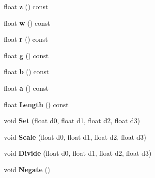 \begin{DoxyCompactItemize}
\item 
\hypertarget{classVec4f_a810931422b57413fe997648b7b3af01d}{float {\bfseries z} () const }\label{classVec4f_a810931422b57413fe997648b7b3af01d}

\item 
\hypertarget{classVec4f_a50fc37943df263c5c656aa0707b4b5ef}{float {\bfseries w} () const }\label{classVec4f_a50fc37943df263c5c656aa0707b4b5ef}

\item 
\hypertarget{classVec4f_afac8aafe64ff4b5f30c67dd885a912f9}{float {\bfseries r} () const }\label{classVec4f_afac8aafe64ff4b5f30c67dd885a912f9}

\item 
\hypertarget{classVec4f_ac761cb0275da3e8309fa1ea2aa97211f}{float {\bfseries g} () const }\label{classVec4f_ac761cb0275da3e8309fa1ea2aa97211f}

\item 
\hypertarget{classVec4f_a68a0e7c40d2a9a761de53041aad8c577}{float {\bfseries b} () const }\label{classVec4f_a68a0e7c40d2a9a761de53041aad8c577}

\item 
\hypertarget{classVec4f_af12a900ddc3e3eeb9bbe10d721392f4a}{float {\bfseries a} () const }\label{classVec4f_af12a900ddc3e3eeb9bbe10d721392f4a}

\item 
\hypertarget{classVec4f_a374d8d253020a8db79de8a19b0bcfb21}{float {\bfseries \-Length} () const }\label{classVec4f_a374d8d253020a8db79de8a19b0bcfb21}

\item 
\hypertarget{classVec4f_aee24f98156cf8f6b7b2c82226c1b45b8}{void {\bfseries \-Set} (float d0, float d1, float d2, float d3)}\label{classVec4f_aee24f98156cf8f6b7b2c82226c1b45b8}

\item 
\hypertarget{classVec4f_a4e278a1a03fc75d08b2479434d02a93b}{void {\bfseries \-Scale} (float d0, float d1, float d2, float d3)}\label{classVec4f_a4e278a1a03fc75d08b2479434d02a93b}

\item 
\hypertarget{classVec4f_a15519ea147364b4f0f4d06f5ed2e84a0}{void {\bfseries \-Divide} (float d0, float d1, float d2, float d3)}\label{classVec4f_a15519ea147364b4f0f4d06f5ed2e84a0}

\item 
\hypertarget{classVec4f_afde9b6639cddcd05e50939206070cae5}{void {\bfseries \-Negate} ()}\label{classVec4f_afde9b6639cddcd05e50939206070cae5}


\end{DoxyCompactItemize}
